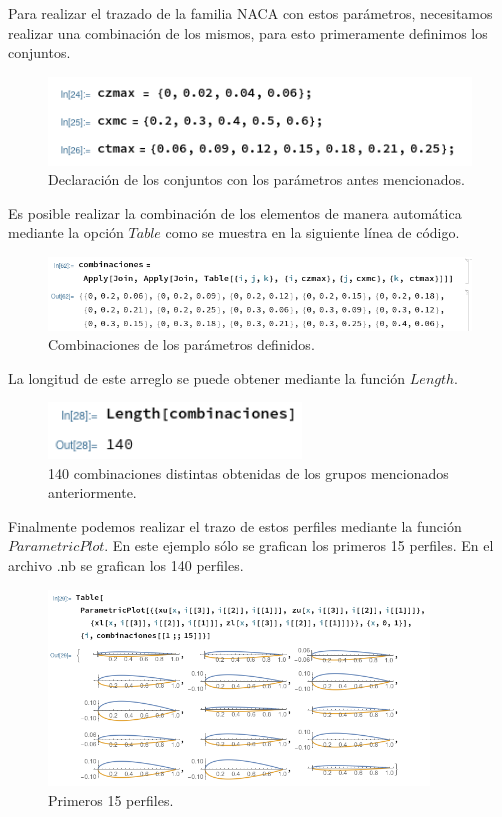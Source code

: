 \documentclass[12pt, letterpaper]{article}
\begin{document}
Para realizar el trazado de la familia NACA con estos parámetros, necesitamos realizar una combinación de los mismos, para esto primeramente definimos los conjuntos.

\begin{figure}[H]
	\centering
	\includegraphics[width=\textwidth]{1.png}
	\caption{Declaración de los conjuntos con los parámetros antes mencionados.}
\end{figure}

Es posible realizar la combinación de los elementos de manera automática mediante la opción $Table$ como se muestra en la siguiente línea de código.

\begin{figure}[H]
	\centering
	\includegraphics[width=\textwidth]{2.png}
	\caption{Combinaciones de los parámetros definidos.}
\end{figure}

La longitud de este arreglo se puede obtener mediante la función $Length$.
\begin{figure}[H]
	\centering
	\includegraphics[width=0.6\textwidth]{3.png}
	\caption{140 combinaciones distintas obtenidas de los grupos mencionados anteriormente.}
\end{figure}

Finalmente podemos realizar el trazo de estos perfiles mediante la función $ParametricPlot$. En este ejemplo sólo se grafican los primeros 15 perfiles. En el archivo .nb se grafican los 140 perfiles.
\begin{figure}[H]
	\centering
	\includegraphics[width=0.9\textwidth]{4.png}
	\caption{Primeros 15 perfiles.}
\end{figure}
\end{document}
